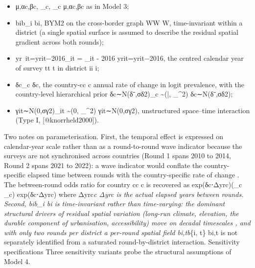 \documentclass{article}
\begin{document}
\begin{itemize}

\item μ,αc,βc\mu, \alpha_c, \bm{\beta}_c
μ,αc​,βc​ as in Model 3;

\item bib_i
bi​, BYM2 on the cross-border graph WW
W, time-invariant within a district (a single spatial surface is assumed to describe the residual spatial gradient across both rounds);

\item yr~it=yrit−2016_{it} = _{it} - 2016
yr​it​=yrit​−2016, the centred calendar year of survey tt
t in district ii
i;

\item δc\delta_c
δc​, the country-cc
c annual rate of change in logit prevalence, with the country-level hierarchical prior δc∼N(δˉ,σδ2)\delta_c \sim {}(\bar{\delta}, \sigma_\delta^{2})
δc​∼N(δˉ,σδ2​);

\item γit∼N(0,σγ2)\gamma_{it} \sim {}(0, \sigma_\gamma^{2})
γit​∼N(0,σγ2​), unstructured space–time interaction (Type I, [@knorrheld2000]).

\end{itemize}

Two notes on parameterisation. First, the temporal effect is expressed
on calendar-year scale rather than as a round-to-round wave indicator
because the surveys are not synchronised across countries (Round 1 spans
2010 to 2014, Round 2 spans 2021 to 2022): a wave indicator would
conflate the country-specific elapsed time between rounds with the
country-specific rate of change \citep{wakefield2020}. The between-round
odds ratio for country cc c is recovered as exp⁡(δc⋅Δyrc)\exp(\delta\_c
\cdot \Delta {}\_c) exp(δc\hspace{0pt}⋅Δyrc\hspace{0pt}) where
Δyrc\Delta {}\emph{c Δyrc\hspace{0pt} is the actual elapsed years
between rounds. Second, bib\_i bi\hspace{0pt} is time-invariant rather
than time-varying: the dominant structural drivers of residual spatial
variation (long-run climate, elevation, the durable component of
urbanisation, accessibility) move on decadal timescales
\citep{bhatt2015, weiss2020}, and with only two rounds per district a
per-round spatial field bi,tb}\{i, t\} bi,t\hspace{0pt} is not
separately identified from a saturated round-by-district interaction.
Sensitivity specifications \label{sec:sens} Three sensitivity variants
probe the structural assumptions of Model 4.
\end{document}
